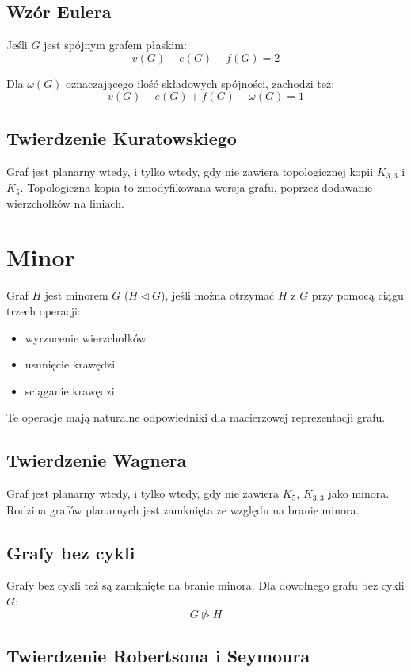 \documentclass{../notatki}
\begin{document}
\subsection{Wzór Eulera}

Jeśli $G$ jest spójnym grafem płaskim:
$$
v(G) - e(G) + f(G) = 2
$$

Dla $\omega(G)$ oznaczającego ilość składowych spójności, zachodzi też:
$$
v(G) - e(G) + f(G) - \omega(G) = 1
$$

\subsection{Twierdzenie Kuratowskiego}

Graf jest planarny wtedy, i tylko wtedy, gdy nie zawiera topologicznej kopii
$K_{3,3}$ i $K_5$. Topologiczna kopia to zmodyfikowana wersja grafu, poprzez
dodawanie wierzchołków na liniach.

\section{Minor}

Graf $H$ jest minorem $G$ ($H \triangleleft G$), jeśli można otrzymać $H$ z $G$
przy pomocą ciągu trzech operacji:
\begin{itemize}
  \item wyrzucenie wierzchołków
  \item usunięcie krawędzi
  \item sciąganie krawędzi
\end{itemize}
Te operacje mają naturalne odpowiedniki dla macierzowej reprezentacji grafu.

\subsection{Twierdzenie Wagnera}

Graf jest planarny wtedy, i tylko wtedy, gdy nie zawiera $K_5$, $K_{3,3}$ jako
minora. Rodzina grafów planarnych jest zamknięta ze względu na branie minora.

\subsection{Grafy bez cykli}

Grafy bez cykli też są zamknięte na branie minora. Dla dowolnego
grafu bez cykli $G$:
$$
G \ntriangleright H
$$

\subsection{Twierdzenie Robertsona i Seymoura}
\end{document}

